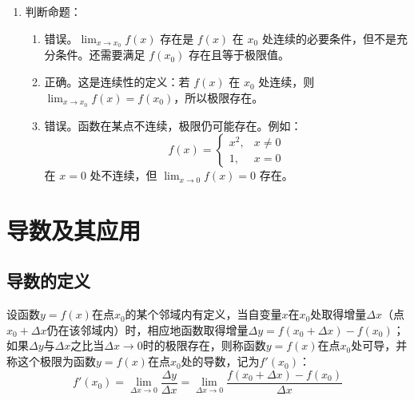 \documentclass[oneside]{book}
\begin{document}
\begin{answer}
\begin{enumerate}
    计算左极限：$\displaystyle \lim_{x \to 1^-} f(x) = \lim_{x \to 1^-} (x^2 + ax + b) = 1^2 + a \cdot 1 + b = 1 + a + b$
    
    计算右极限：$\displaystyle \lim_{x \to 1^+} f(x) = \lim_{x \to 1^+} (2x + 3) = 2 \times 1 + 3 = 5$
    
    函数值：$f(1) = 1^2 + a \cdot 1 + b = 1 + a + b$
    
    由连续性条件得：
    \[
    1 + a + b = 5
    \]
    解得 $a + b = 4$。
    
    因此，当 $a + b = 4$ 时，函数 $f(x)$ 在 $x=1$ 处连续。例如，取 $a = 0, b = 4$ 或 $a = 1, b = 3$ 等。
    
    \item 判断命题：
    \begin{enumerate}
        \item 错误。$\displaystyle \lim_{x \to x_0} f(x)$ 存在是 $f(x)$ 在 $x_0$ 处连续的必要条件，但不是充分条件。还需要满足 $f(x_0)$ 存在且等于极限值。
        
        \item 正确。这是连续性的定义：若 $f(x)$ 在 $x_0$ 处连续，则 $\displaystyle \lim_{x \to x_0} f(x) = f(x_0)$，所以极限存在。
        
        \item 错误。函数在某点不连续，极限仍可能存在。例如：
        \[
        f(x) = \begin{cases}
            x^2, & x \neq 0 \\
            1, & x = 0
        \end{cases}
        \]
        在 $x=0$ 处不连续，但 $\displaystyle \lim_{x \to 0} f(x) = 0$ 存在。
    \end{enumerate}
\end{enumerate}
\end{answer}



\newpage
\section{导数及其应用}

\subsection{导数的定义}

\begin{definition}[导数]
设函数$y=f(x)$在点$x_0$的某个邻域内有定义，当自变量$x$在$x_0$处取得增量$\Delta x$（点$x_0+\Delta x$仍在该邻域内）时，相应地函数取得增量$\Delta y = f(x_0+\Delta x) - f(x_0)$；如果$\Delta y$与$\Delta x$之比当$\Delta x \to 0$时的极限存在，则称函数$y=f(x)$在点$x_0$处可导，并称这个极限为函数$y=f(x)$在点$x_0$处的导数，记为$f'(x_0)$：
\[
f'(x_0) = \lim_{\Delta x \to 0} \frac{\Delta y}{\Delta x} = \lim_{\Delta x \to 0} \frac{f(x_0+\Delta x) - f(x_0)}{\Delta x}
\]
\end{definition}
\end{document}
